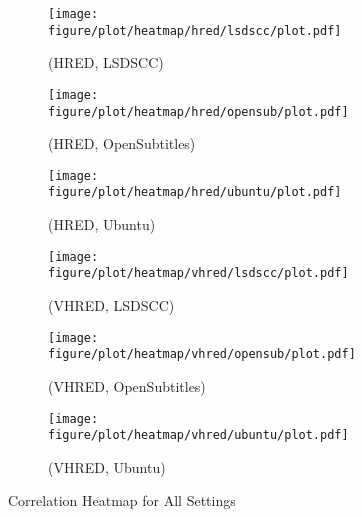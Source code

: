 \begin{figure}
    \centering
    \begin{subfigure}{0.33\linewidth}
        \centering
        \texttt{[image: figure/plot/heatmap/hred/lsdscc/plot.pdf]}
        \caption{(HRED, LSDSCC)}
    \end{subfigure}%
    \begin{subfigure}{0.33\linewidth}
        \centering
        \texttt{[image: figure/plot/heatmap/hred/opensub/plot.pdf]}
        \caption{(HRED, OpenSubtitles)}
    \end{subfigure}%
    \begin{subfigure}{0.33\linewidth}
        \centering
        \texttt{[image: figure/plot/heatmap/hred/ubuntu/plot.pdf]}
        \caption{(HRED, Ubuntu)}
    \end{subfigure}
    \begin{subfigure}{0.33\linewidth}
        \centering
        \texttt{[image: figure/plot/heatmap/vhred/lsdscc/plot.pdf]}
        \caption{(VHRED, LSDSCC)}
    \end{subfigure}%
    \begin{subfigure}{0.33\linewidth}
        \centering
        \texttt{[image: figure/plot/heatmap/vhred/opensub/plot.pdf]}
        \caption{(VHRED, OpenSubtitles)}
    \end{subfigure}%
    \begin{subfigure}{0.33\linewidth}
        \centering
        \texttt{[image: figure/plot/heatmap/vhred/ubuntu/plot.pdf]}
        \caption{(VHRED, Ubuntu)}
    \end{subfigure}
    \caption{Correlation Heatmap for All Settings}
    \label{fig:corr_heatmap}
\end{figure}
